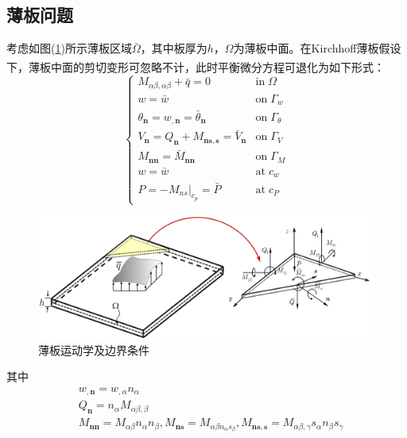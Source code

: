 \subsection{薄板问题}
考虑如图(\ref{plate})所示薄板区域$\bar \Omega$，其中板厚为$h$，$\Omega$为薄板中面。在Kirchhoff薄板假设下\textsuperscript{\cite{ventsel2002}}，薄板中面的剪切变形可忽略不计，此时平衡微分方程可退化为如下形式：
\begin{equation}
    \begin{cases}\label{P control equation}
        M_{\alpha\beta,\alpha\beta}+\bar q=0&\mathrm{in} \; \Omega\\
        w=\bar w&\mathrm{on}\;\Gamma_w\\
        \theta_{\pmb n}=w_{,\pmb n}=\bar \theta_{\pmb n}&\mathrm{on}\;\Gamma_{\theta}\\
        V_{\pmb n}=Q_{\pmb n}+M_{\pmb{ns},\pmb s}=\bar V_{\pmb n}&\mathrm{on}\;\Gamma_V\\
        M_{\pmb{nn}}=\bar M_{\pmb{nn}}&\mathrm{on}\; \Gamma_M\\
        w=\bar w&\mathrm{at} \; c_w\\
        P=-\left .M_{ns} \right \vert_{c_p}=\bar P&\mathrm{at}\; c_P
    \end{cases}
\end{equation}
\begin{figure}[H]
    \centering
    \includegraphics[scale=0.7]{figure/nomesh/plate.png}
    \caption{薄板运动学及边界条件}\label{plate}
\end{figure}
\noindent
其中
\begin{subequations}
\begin{align}
\label{wn} &w_{,\pmb n}=w_{,\alpha}n_{\alpha}\\
\label{Qn} &Q_{\pmb n}=n_{\alpha}M_{\alpha\beta,\beta}\\
\label{Mn} &M_{\pmb{nn}}=M_{\alpha\beta}n_{\alpha}n_{\beta},M_{\pmb{ns}}=M_{\alpha\beta n_{\alpha}s_{\beta}},M_{\pmb{ns,s}}=M_{\alpha\beta,\gamma}s_{\alpha}n_{\beta}s_{\gamma}
\end{align}
\end{subequations}
